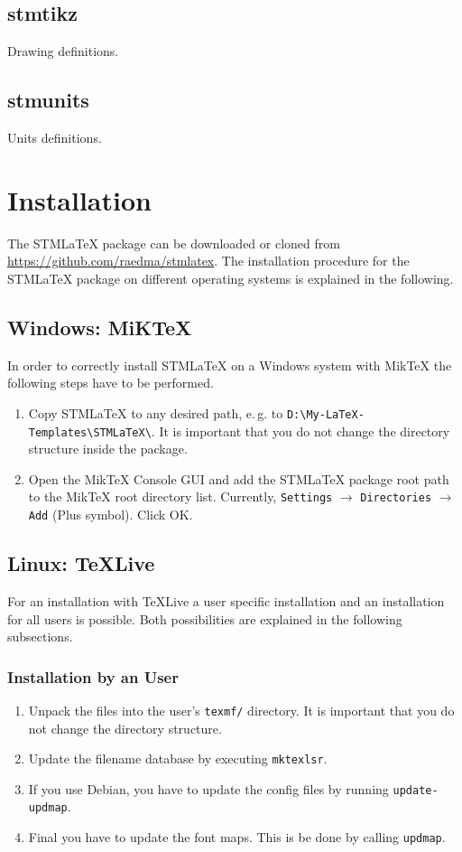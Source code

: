 \documentclass[%
  type=article,%
  layout=koma,%
  page=false,%
  hyperref=true,%
  cleveref=true,%
  conditionallox=true,%
  conditionalloxnewpage=true,%
  date=true,%
  glossaries=true,%
  index=true,%
  math=true,%
  listings=true%
]{stmtext}
\newcommand{\package}[1]{\subsection*{#1}\par\medskip\noindent\ignorespaces}
\newcommand{\stmlatex}{STM\LaTeX\xspace}
\begin{document}
\package{stmtikz}
Drawing definitions.

\package{stmunits}
Units definitions.

\section{Installation}

The \stmlatex package can be downloaded or cloned from \url{https://github.com/raedma/stmlatex}. The installation procedure for the \stmlatex package on different operating systems is explained in the following.

\subsection{Windows: MiKTeX}

In order to correctly install \stmlatex on a Windows system with MikTeX the following steps have to be performed. 

\begin{enumerate}
  \item Copy \stmlatex to any desired path, e.\,g. to \texttt{D:\textbackslash My-LaTeX-Templates\textbackslash STMLaTeX\textbackslash}. It is important that you do not change the directory structure inside the package.
  \item Open the MikTeX Console GUI and add the \stmlatex package root path to the MikTeX root directory list. Currently, \texttt{Settings} $\rightarrow$ \texttt{Directories} $\rightarrow$ \texttt{Add} (Plus symbol). Click OK.
\end{enumerate}

\subsection{Linux: TeXLive}

For an installation with TeXLive a user specific installation and an installation for all users is possible. Both possibilities are explained in the following subsections.

\subsubsection{Installation by an User}
\begin{enumerate}		
  \item Unpack the files into the user's \texttt{texmf/} directory. It is important that you do not change the directory structure.
  \item Update the filename database by executing \texttt{mktexlsr}.
  \item If you use Debian, you have to update the config files by running \texttt{update-updmap}.
  \item Final you have to update the font maps. This is be done by calling \texttt{updmap}.
\end{enumerate}
\end{document}
